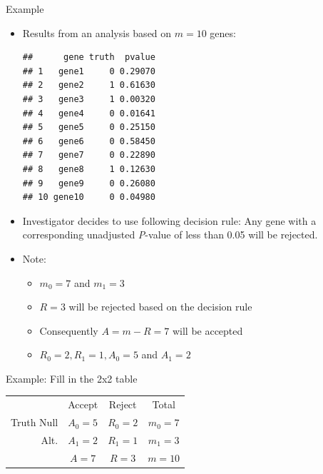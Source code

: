 \documentclass[xcolor=x11names,compress]{beamer}\usepackage[]{graphicx}\usepackage[]{color}
\makeatletter
\newenvironment{kframe}{%
 \def\at@end@of@kframe{}%
 \ifinner\ifhmode%
  \def\at@end@of@kframe{\end{minipage}}%
  \begin{minipage}{\columnwidth}%
 \fi\fi%
 \def\FrameCommand##1{\hskip\@totalleftmargin \hskip-\fboxsep
 \colorbox{shadecolor}{##1}\hskip-\fboxsep
     \hskip-\linewidth \hskip-\@totalleftmargin \hskip\columnwidth}%
 \MakeFramed {\advance\hsize-\width
   \@totalleftmargin\z@ \linewidth\hsize
   \@setminipage}}%
 {\par\unskip\endMakeFramed%
 \at@end@of@kframe}
\newenvironment{knitrout}{}{} %
\makeatother
\begin{document}
\begin{frame}[fragile]{Example}
  \begin{itemize}
  \item Results from an analysis based on $m=10$ genes:  
\begin{knitrout}\tiny
{}\color{fgcolor}\begin{kframe}
\begin{verbatim}
##      gene truth  pvalue
## 1   gene1     0 0.29070
## 2   gene2     1 0.61630
## 3   gene3     1 0.00320
## 4   gene4     0 0.01641
## 5   gene5     0 0.25150
## 6   gene6     0 0.58450
## 7   gene7     0 0.22890
## 8   gene8     1 0.12630
## 9   gene9     0 0.26080
## 10 gene10     0 0.04980
\end{verbatim}
\end{kframe}
\end{knitrout}
\item Investigator decides to use following decision rule:
  Any gene with a corresponding unadjusted {\it P}-value of less than 0.05 will
  be rejected.
  \item Note:
    \begin{itemize}
 \item $m_0=7$ and $m_1=3$ 
  
  \item $R=3$ will be rejected based on the decision rule
  \item Consequently $A=m-R=7$ will be accepted
  \item $R_0=2,R_1=1, A_0=5$ and $A_1=2$
\end{itemize}
\end{itemize}

\end{frame}


\begin{frame}{Example: Fill in the 2x2 table}
 \begin{center}
  \begin{tabular}{r|c|c|c}
    & Accept & Reject & Total \\
   \cline{1-4}
  Truth Null  & $A_0=5$ & $R_0=2$ & $m_0=7$ \\
  \cline{1-4}
    Alt. & $A_1=2$ & $R_1=1$ & $m_1=3$ \\
  \cline{1-4} 
    & $A=7$ & $R=3$ & $m=10$
  \end{tabular}
  \end{center}
 
\end{frame}
\end{document}
